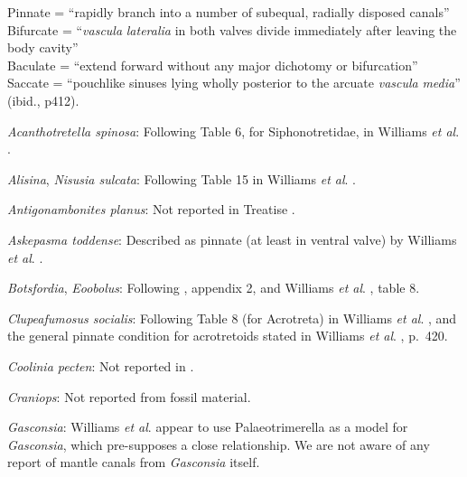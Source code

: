 \documentclass[openany]{book}
\theoremstyle{definition}
\theoremstyle{definition}
\theoremstyle{definition}
\theoremstyle{remark}
\begin{document}
Pinnate = ``rapidly branch into a number of subequal, radially disposed
canals''\\
Bifurcate = ``\emph{vascula} \emph{lateralia} in both valves divide
immediately after leaving the body cavity''\\
Baculate = ``extend forward without any major dichotomy or bifurcation''
\citep[ p.~418]{Williams1997Introduction}\\
Saccate = ``pouchlike sinuses lying wholly posterior to the arcuate
\emph{vascula} \emph{media}'' (ibid., p412).

\hypertarget{Acanthotretella_spinosa-coding-25}{}
\emph{Acanthotretella spinosa}: Following Table 6, for Siphonotretidae,
in Williams \emph{et al}.
\citeyearpar{Williams2000LinguliformeaCraniiformea}.

\hypertarget{Alisina-coding-25}{}
\emph{Alisina}, \emph{Nisusia sulcata}: Following Table 15 in Williams
\emph{et al}. \citeyearpar{Williams2000LinguliformeaCraniiformea}.

\hypertarget{Antigonambonites_planus-coding-25}{}
\emph{Antigonambonites planus}: Not reported in Treatise
\citep{Williams2000LinguliformeaCraniiformea}.

\hypertarget{Askepasma_toddense-coding-25}{}
\emph{Askepasma toddense}: Described as pinnate (at least in ventral
valve) by Williams \emph{et al}.
\citeyearpar[p.~250]{Williams1998Thediversity}.

\hypertarget{Botsfordia-coding-25}{}
\emph{Botsfordia}, \emph{Eoobolus}: Following
\citet{Williams1998Thediversity}, appendix 2, and Williams \emph{et al}.
\citeyearpar{Williams2000LinguliformeaCraniiformea}, table 8.

\hypertarget{Clupeafumosus_socialis-coding-25}{}
\emph{Clupeafumosus socialis}: Following Table 8 (for Acrotreta) in
Williams \emph{et al}.
\citeyearpar{Williams2000LinguliformeaCraniiformea}, and the general
pinnate condition for acrotretoids stated in Williams \emph{et al}.
\citeyearpar{Williams1997Introduction}, p.~420.

\hypertarget{Coolinia_pecten-coding-25}{}
\emph{Coolinia pecten}: Not reported in
\citet{Williams2000LinguliformeaCraniiformea}.

\hypertarget{Craniops-coding-25}{}
\emph{Craniops}: Not reported from fossil material.

\hypertarget{Gasconsia-coding-25}{}
\emph{Gasconsia}: Williams \emph{et al}. \citeyearpar[table
15]{Williams2000LinguliformeaCraniiformea} appear to use
Palaeotrimerella \citep[as drawn in][]{Williams1997Introduction} as a
model for \emph{Gasconsia}, which pre-supposes a close relationship. We
are not aware of any report of mantle canals from \emph{Gasconsia}
itself.
\end{document}
